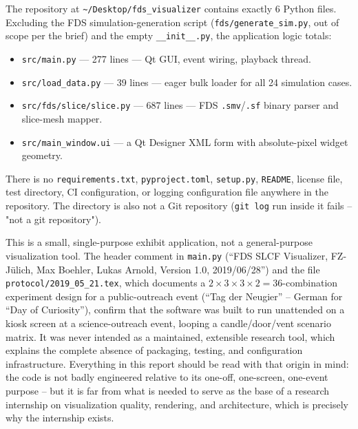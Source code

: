 \documentclass[11pt,a4paper]{report}
\begin{document}
\begin{factbox}
The repository at \verb|~/Desktop/fds_visualizer| contains exactly 6 Python files.
Excluding the FDS simulation-generation script (\texttt{fds/generate\_sim.py}, out of scope per the
brief) and the empty \texttt{\_\_init\_\_.py}, the application logic totals:
\begin{itemize}[nosep]
  \item \texttt{src/main.py} --- 277 lines --- Qt GUI, event wiring, playback thread.
  \item \texttt{src/load\_data.py} --- 39 lines --- eager bulk loader for all 24 simulation cases.
  \item \texttt{src/fds/slice/slice.py} --- 687 lines --- FDS \texttt{.smv}/\texttt{.sf} binary parser and slice-mesh mapper.
  \item \texttt{src/main\_window.ui} --- a Qt Designer XML form with absolute-pixel widget geometry.
\end{itemize}
There is no \texttt{requirements.txt}, \texttt{pyproject.toml}, \texttt{setup.py}, \texttt{README},
license file, test directory, CI configuration, or logging configuration file anywhere in the
repository. The directory is also not a Git repository (\texttt{git log} run inside it fails --
"not a git repository").
\end{factbox}

\begin{interpbox}
This is a small, single-purpose exhibit application, not a general-purpose visualization tool.
The header comment in \texttt{main.py} (``FDS SLCF Visualizer, FZ-J\"ulich, Max Boehler, Lukas
Arnold, Version 1.0, 2019/06/28'') and the file \texttt{protocol/2019\_05\_21.tex}, which documents a
$2\times3\times3\times2=36$-combination experiment design for a public-outreach event
(``Tag der Neugier'' -- German for ``Day of Curiosity''), confirm that the software was built to
run unattended on a kiosk screen at a science-outreach event, looping a candle/door/vent scenario
matrix. It was never intended as a maintained, extensible research tool, which explains the complete
absence of packaging, testing, and configuration infrastructure. Everything in this report should be
read with that origin in mind: the code is not badly engineered relative to its one-off, one-screen,
one-event purpose -- but it is far from what is needed to serve as the base of a research
internship on visualization quality, rendering, and architecture, which is precisely why the
internship exists.
\end{interpbox}
\end{document}
